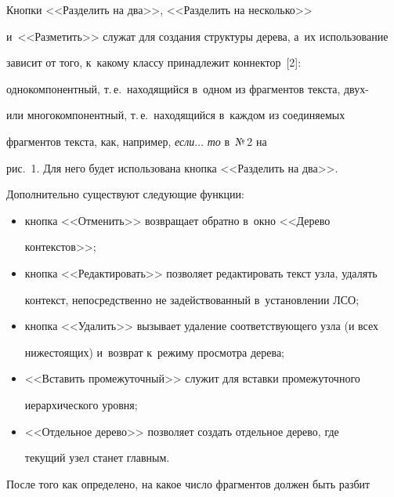   Кнопки <<Разделить на два>>, <<Разделить на несколько>> 


  и~<<Разметить>> служат для создания структуры дерева, а~их использование 


зависит от того, к~какому классу принадлежит коннектор~[2]: 


однокомпонентный, т.\,е.\ находящийся в~одном из фрагментов текста, двух- 


или многокомпонентный, т.\,е.\ находящийся в~каж\-дом из соединяемых 


фрагментов текс\-та, как, например, \textit{если}$\ldots$ \textit{то} в~№\,2 на 


рис.~1. Для него будет использована кнопка <<Разделить на два>>. 


  


  Дополнительно существуют следующие функции:


  \begin{itemize}


\item кнопка <<Отменить>> возвращает обратно в~окно <<Дерево 


контекстов>>; %


\item кнопка <<Редактировать>> позволяет редактировать текст узла, удалять 


контекст, непосредственно не задействованный в~установлении ЛСО; %


\item кнопка <<Удалить>> вызывает удаление соответствующего узла (и всех 


нижестоящих) и~возврат к~режиму про\-смот\-ра дерева; %


\item <<Вставить промежуточный>> служит для встав\-ки промежуточного 


иерархического уровня; %


\item  <<Отдельное дерево>> позволяет создать отдельное дерево, где 


текущий узел станет главным.


\end{itemize}





  После того как определено, на какое число фрагментов должен быть разбит 


